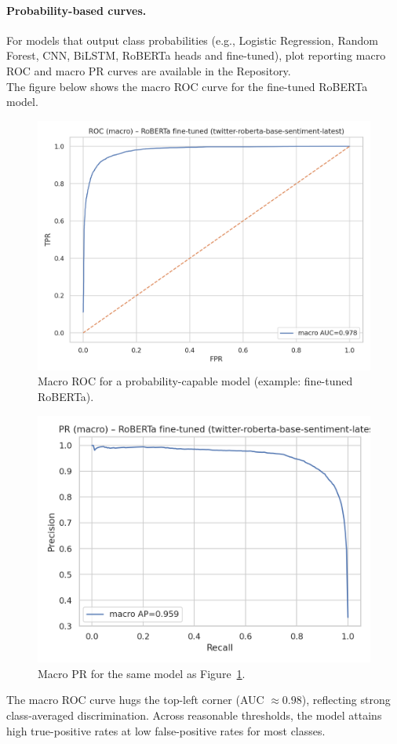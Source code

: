 \documentclass[10pt]{article}
\begin{document}
\paragraph{Probability-based curves.}
For models that output class probabilities (e.g., Logistic Regression, Random Forest, CNN, BiLSTM, RoBERTa heads and fine-tuned), plot reporting macro ROC and macro PR curves are available in the Repository.\\
The figure below shows the macro ROC curve for the fine-tuned RoBERTa model.
\begin{figure}[H]
  \centering
  \includegraphics[width=.55\linewidth]{../SCRITPS/artifacts/figures/curves_roberta_fine-tuned_(twitter-roberta-base-sentiment-latest)_roc_macro.png}
  \caption{Macro ROC for a probability-capable model (example: fine-tuned RoBERTa).}
  \label{fig:roc-example}
\end{figure}

\begin{figure}[H]
  \centering
  \includegraphics[width=.55\linewidth]{../SCRITPS/artifacts/figures/curves_roberta_fine-tuned_(twitter-roberta-base-sentiment-latest)_pr_macro.png}
  \caption{Macro PR for the same model as Figure~\ref{fig:roc-example}.}
  \label{fig:pr-example}
\end{figure}
The macro ROC curve hugs the top-left corner (AUC $\approx 0.98$), reflecting strong class-averaged discrimination. Across reasonable thresholds, the model attains high true-positive rates at low false-positive rates for most classes.
\end{document}
